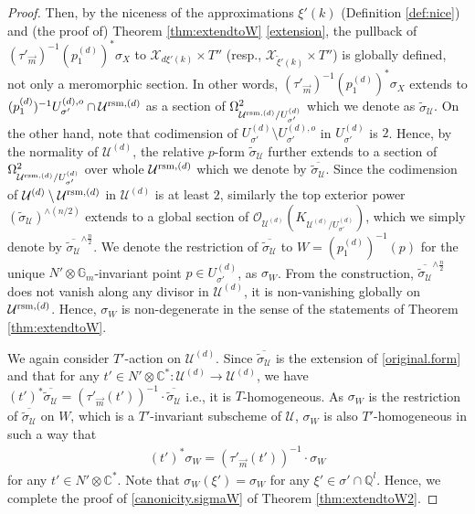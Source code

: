 \documentclass[12pt,a4paper]{amsart}
\theoremstyle{remark}
\theoremstyle{definition}
\def\C{\mathbb{C}}
\def\G{\mathbb{G}}
\def\Q{\mathbb{Q}}
\def\X{\mathcal{X}}
\begin{document}
\begin{proof}
Then, by the niceness of the approximations 
$\xi'(k)$ (Definition \ref{def:nice}) 
and (the proof of) Theorem \ref{thm:extendtoW} 
\eqref{extension}, 
the pullback of 
$(\tau'_{\vec{m}})^{-1}(p_1^{(d)})^*\sigma_X$ to 
$\X_{d\xi'(k)}\times T''$ (resp., $\X_{\tilde{\xi}'(k)}\times T''$) is globally defined, not only a meromorphic section. 
In other words, 
 $ (\tau'_{\vec{m}})^{-1}(p_1^{(d)})^*\sigma_X$
 extends to 
 $(p_1^{(d)})^{-1}U_{\sigma'}^{(d),o}\cap \mathcal{U}^{{\rm rsm}, (d)}$ 
 as a section of 
 $\Omega^2_{\mathcal{U}^{{\rm rsm}, (d)}/U_{\sigma'}^{(d)}}$ 
 which we denote as $\tilde{\sigma}_{\mathcal{U}}$. 
 On the other hand, note that codimension of 
 $U_{\sigma'}^{(d)}\setminus U_{\sigma'}^{(d),o}$ in 
 $U_{\sigma'}^{(d)}$ is $2$. Hence, by the normality 
 of $\mathcal{U}^{(d)}$, the relative $p$-form $\tilde{\sigma}_{\mathcal{U}}$ further 
 extends to a section of 
  $\Omega^2_{\mathcal{U}^{{\rm rsm}, (d)}/U_{\sigma'}^{(d)}}$ over whole 
  $\mathcal{U}^{{\rm rsm}, (d)}$ which we denote by 
  $\overline{\tilde{\sigma}_{\mathcal{U}}}$. Since the codimension of 
  $\mathcal{U}^{(d)}\setminus \mathcal{U}^{{\rm rsm}, (d)}$ in 
  $\mathcal{U}^{(d)}$ is at least $2$, similarly 
 the top exterior power 
 $(\tilde{\sigma}_{\mathcal{U}})^{\wedge (n/2)}$ extends to a global section of 
 $\mathcal{O}_{\mathcal{U}^{(d)}}(K_{\mathcal{U}^{(d)}/U_{\sigma'}^{(d)}})$, 
 which we simply denote by $\overline{\tilde{\sigma}_{\mathcal{U}}}^{\wedge \frac{n}{2}}$. 
 We denote the restriction of 
 $\overline{\tilde{\sigma}_{\mathcal{U}}}$  
 to $W=(p_1^{(d)})^{-1}(p)$ for the unique 
 $N'\otimes \G_m$-invariant point $p\in U_{\sigma'}^{(d)}$, 
 as $\sigma_W$. 
 From the construction, $\overline{\tilde{\sigma}_{\mathcal{U}}}^{\wedge \frac{n}{2}}$ does not vanish along any divisor in $\mathcal{U}^{(d)}$, 
 it is non-vanishing globally on $\mathcal{U}^{{\rm rsm}, (d)}$. 
 Hence, $\sigma_W$ is non-degenerate in the sense of the statements of Theorem \ref{thm:extendtoW}. 

 We again consider $T'$-action on $\mathcal{U}^{(d)}$. 
 Since $\overline{\tilde{\sigma}_{\mathcal{U}}}$ is the extension of 
 \eqref{original.form} and that for any $t'\in N'\otimes \C^* \colon 
 \mathcal{U}^{(d)}\to \mathcal{U}^{(d)}$, we have 
 $(t')^*\overline{\tilde{\sigma}_{\mathcal{U}}}=(\tau'_{\vec{m}}(t'))^{-1}\cdot \overline{\tilde{\sigma}_{\mathcal{U}}}$ i.e., it is $T$-homogeneous. 
 As $\sigma_W$ is the restriction of $\overline{\tilde{\sigma}_{\mathcal{U}}}$ 
 on $W$, which is a $T'$-invariant subscheme of $\mathcal{U}$, $\sigma_W$ is also $T'$-homogeneous in such a way that 
 \begin{align}\label{sigmaeigen}
     (t')^*\sigma_W=(\tau'_{\vec{m}}(t'))^{-1}\cdot \sigma_W 
 \end{align}
 for any $t'\in N'\otimes \C^*$. 
 Note that $\sigma_W(\xi')=\sigma_W$ for any $\xi'\in \sigma'\cap \Q^l$. 
Hence, we complete the proof of  \eqref{canonicity.sigmaW} 
of Theorem \ref{thm:extendtoW2}. 
 \end{proof}
\end{document}
